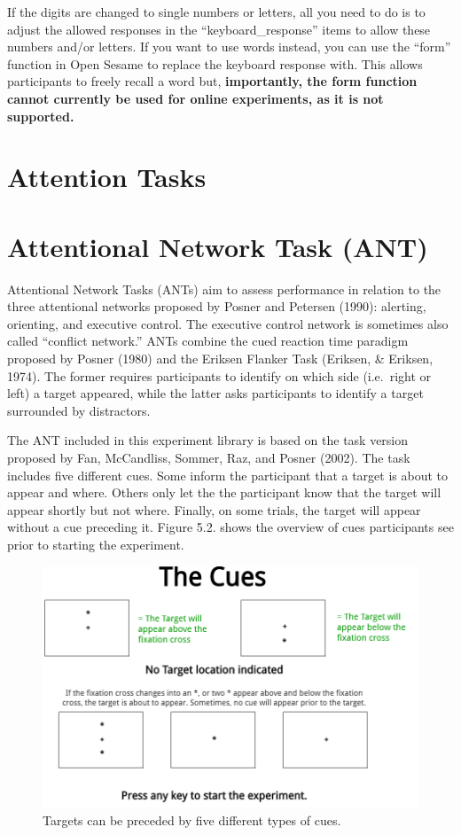 \documentclass[
]{book}
\begin{document}
If the digits are changed to single numbers or letters, all you need to do is to adjust the allowed responses in the ``keyboard\_response'' items to allow these numbers and/or letters. If you want to use words instead, you can use the ``form'' function in Open Sesame to replace the keyboard response with. This allows participants to freely recall a word but, \textbf{importantly, the form function cannot currently be used for online experiments, as it is not supported.}

\hypertarget{attention-tasks}{%
\section{Attention Tasks}\label{attention-tasks}}

\hypertarget{attentional-network-task-ant}{%
\section{Attentional Network Task (ANT)}\label{attentional-network-task-ant}}

Attentional Network Tasks (ANTs) aim to assess performance in relation to the three attentional networks proposed by Posner and Petersen (1990): alerting, orienting, and executive control. The executive control network is sometimes also called ``conflict network.'' ANTs combine the cued reaction time paradigm proposed by Posner (1980) and the Eriksen Flanker Task (Eriksen, \& Eriksen, 1974). The former requires participants to identify on which side (i.e.~right or left) a target appeared, while the latter asks participants to identify a target surrounded by distractors.

The ANT included in this experiment library is based on the task version proposed by Fan, McCandliss, Sommer, Raz, and Posner (2002). The task includes five different cues. Some inform the participant that a target is about to appear and where. Others only let the the participant know that the target will appear shortly but not where. Finally, on some trials, the target will appear without a cue preceding it. Figure 5.2. shows the overview of cues participants see prior to starting the experiment.

\begin{figure}

{\centering \includegraphics[width=0.8\linewidth]{images/ANT_Cues} 

}

\caption{Targets can be preceded by five different types of cues.}\label{fig:Figure3-2}
\end{figure}
\end{document}

